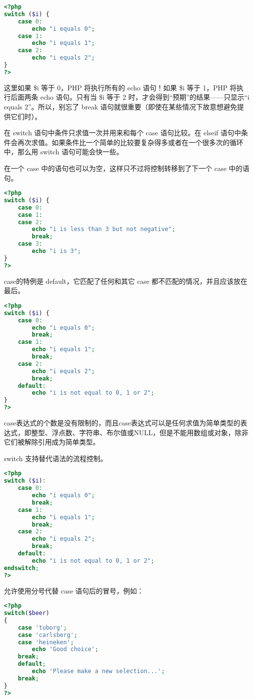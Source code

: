 \begin{lstlisting}[language=PHP]
<?php
switch ($i) {
    case 0:
        echo "i equals 0";
    case 1:
        echo "i equals 1";
    case 2:
        echo "i equals 2";
}
?>
\end{lstlisting}

这里如果 \$i 等于 0，PHP 将执行所有的 echo 语句！如果 \$i 等于 1，PHP 将执行后面两条 echo 语句。只有当 \$i 等于 2 时，才会得到“预期”的结果——只显示“i equals 2”。所以，别忘了 break 语句就很重要（即使在某些情况下故意想避免提供它们时）。

在 switch 语句中条件只求值一次并用来和每个 case 语句比较。在 elseif 语句中条件会再次求值。如果条件比一个简单的比较要复杂得多或者在一个很多次的循环中，那么用 switch 语句可能会快一些。

在一个 case 中的语句也可以为空，这样只不过将控制转移到了下一个 case 中的语句。

\begin{lstlisting}[language=PHP]
<?php
switch ($i) {
    case 0:
    case 1:
    case 2:
        echo "i is less than 3 but not negative";
        break;
    case 3:
        echo "i is 3";
}
?>
\end{lstlisting}


case的特例是 default，它匹配了任何和其它 case 都不匹配的情况，并且应该放在最后。

\begin{lstlisting}[language=PHP]
<?php
switch ($i) {
    case 0:
        echo "i equals 0";
        break;
    case 1:
        echo "i equals 1";
        break;
    case 2:
        echo "i equals 2";
        break;
    default:
        echo "i is not equal to 0, 1 or 2";
}
?>
\end{lstlisting}

case表达式的个数是没有限制的，而且case表达式可以是任何求值为简单类型的表达式，即整型、浮点数、字符串、布尔值或NULL，但是不能用数组或对象，除非它们被解除引用成为简单类型。

switch 支持替代语法的流程控制。

\begin{lstlisting}[language=PHP]
<?php
switch ($i):
    case 0:
        echo "i equals 0";
        break;
    case 1:
        echo "i equals 1";
        break;
    case 2:
        echo "i equals 2";
        break;
    default:
        echo "i is not equal to 0, 1 or 2";
endswitch;
?>
\end{lstlisting}


允许使用分号代替 case 语句后的冒号，例如：

\begin{lstlisting}[language=PHP]
<?php
switch($beer)
{
    case 'tuborg';
    case 'carlsberg';
    case 'heineken';
        echo 'Good choice';
    break;
    default;
        echo 'Please make a new selection...';
    break;
}
?>
\end{lstlisting}

